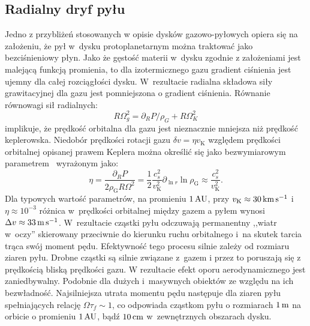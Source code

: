 \subsection{Radialny dryf pyłu}
Jedno z przybliżeń stosowanych w opisie dysków gazowo-pyłowych opiera się na
założeniu, że pył w~dysku protoplanetarnym można traktować jako bezciśnieniowy płyn. 
Jako że gęstość materii w~dysku zgodnie z założeniami jest malejącą funkcją
promienia, to dla izotermicznego gazu gradient ciśnienia jest ujemny dla całej
rozciągłości dysku. W~rezultacie radialna składowa siły grawitacyjnej dla gazu
jest pomniejszona o gradient ciśnienia. Równanie równowagi sił radialnych:
%
\begin{equation}
   R\Omega_g^2 = \partial_R P / \rho_G + R\Omega_K^2
\end{equation}
%
implikuje, że prędkość orbitalna dla gazu jest nieznacznie mniejsza niż prędkość
keplerowska. Niedobór prędkości rotacji gazu $\delta v = \eta v_\textrm{K}$
względem prędkości orbitalnej opisanej prawem Keplera można określić się jako
bezwymiarowym parametrem~\cite{N86} wyrażonym jako:
%
\begin{equation}
   \label{eq:eta}
   \eta = \frac{\partial_R P}{2\rho_\textrm{G} R \Omega^2} = \frac{1}{2}
   \frac{c_s^2}{v_\textrm{K}^2} \partial_{\ln r} \ln \rho_{\textrm{G}} \approx
   \frac{c_s^2}{v_\textrm{K}^2}.
\end{equation}
%
Dla typowych wartość parametrów, na promieniu $1\hbox{$\thinspace\textrm{AU}$}$, przy $v_\textrm{K}\approx
30\hbox{$\thinspace\textrm{km}$}\hbox{$\thinspace\textrm{s}$}^{-1}$ i~$\eta \approx 10^{-3}$ różnica w~prędkości orbitalnej między
gazem a pyłem wynosi $\Delta v \approx 33\hbox{$\thinspace\textrm{m}$}\hbox{$\thinspace\textrm{s}$}^{-1}$.  W~rezultacie cząstki pyłu
odczuwają permanentny ,,wiatr w~oczy'' skierowany przeciwnie do kierunku ruchu
orbitalnego i~na skutek tarcia trąca swój moment pędu. Efektywność tego procesu
silnie zależy od rozmiaru ziaren pyłu. Drobne cząstki są silnie związane z~gazem
i przez to poruszają się z prędkością bliską prędkości gazu. W rezultacie efekt
oporu aerodynamicznego jest zaniedbywalny. Podobnie dla dużych i~masywnych
obiektów ze względu na ich bezwładność. Najsilniejsza utrata momentu pędu
następuje dla ziaren pyłu spełniających relację $\Omega \tau_f \sim 1$, co
odpowiada cząstkom pyłu o rozmiarach $1\hbox{$\thinspace\textrm{m}$}$ na orbicie o promieniu $1\hbox{$\thinspace\textrm{AU}$}$, bądź
$10\hbox{$\thinspace\textrm{cm}$}$ w~zewnętrznych obszarach dysku.

